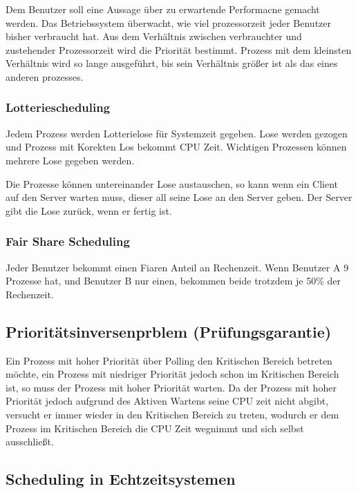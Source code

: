 Dem Benutzer soll eine Aussage über zu erwartende Performacne gemacht werden. Das Betriebssystem überwacht, wie viel prozessorzeit jeder Benutzer bisher verbraucht hat. Aus dem Verhältnis zwischen verbrauchter und zustehender Prozessorzeit wird die Priorität bestimmt. Prozess mit dem kleinsten Verhältnis wird so lange ausgeführt, bis sein Verhältnis größer ist als das eines anderen prozesses.

\subsubsection{Lotteriescheduling}

Jedem Prozess werden Lotterielose für Systemzeit gegeben. Lose werden gezogen und Prozess mit Korekten Los bekommt CPU Zeit. Wichtigen Prozessen können mehrere Lose gegeben werden.

Die Prozesse können untereinander Lose austauschen, so kann wenn ein Client auf den Server warten muss, dieser all seine Lose an den Server geben. Der Server gibt die Lose zurück, wenn er fertig ist.

\subsubsection{Fair Share Scheduling}

Jeder Benutzer bekommt einen Fiaren Anteil an Rechenzeit. Wenn Benutzer A 9 Prozesse hat, und Benutzer B nur einen, bekommen beide trotzdem je 50\% der Rechenzeit.


\subsection{Prioritätsinversenprblem (Prüfungsgarantie)}
\label{prioritaetsinversenproblem}

Ein Prozess mit hoher Priorität über Polling den Kritischen Bereich betreten möchte, ein Prozess mit niedriger Priorität jedoch schon im Kritischen Bereich ist, so muss der Prozess mit hoher Priorität warten. Da der Prozess mit hoher Priorität jedoch aufgrund des Aktiven Wartens seine CPU zeit nicht abgibt, versucht er immer wieder in den Kritischen Bereich zu treten, wodurch er dem Prozess im Kritischen Bereich die CPU Zeit wegnimmt und sich selbst ausschließt.

\subsection{Scheduling in Echtzeitsystemen}

